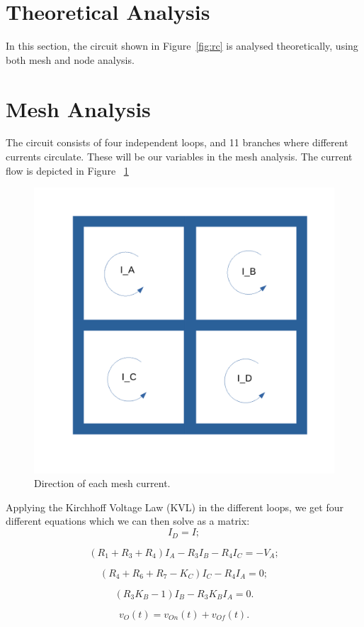 \section{Theoretical Analysis}
\label{sec:analysis}

In this section, the circuit shown in Figure~\ref{fig:rc} is analysed
theoretically, using both mesh and node analysis.

\section{Mesh Analysis}

The circuit consists of four independent loops, and 11 branches where different currents circulate. These will be our variables in the mesh analysis. The current flow is depicted in Figure ~\ref{fig:current}

\begin{figure}[h] \centering
\includegraphics[width=0.4\linewidth]{current.pdf}
\caption{Direction of each mesh current.}
\label{fig:current}
\end{figure}


Applying the Kirchhoff Voltage Law (KVL) in the different loops, we get four different equations which we can then solve as a matrix:
\begin{equation}
  I_D=I;
\end{equation}

\begin{equation}
  (R_1+R_3+R_4)I_A-R_3I_B-R_4I_C=-V_A;
\end{equation}

\begin{equation}
  (R_4+R_6+R_7-K_C)I_C-R_4I_A=0;
\end{equation}

\begin{equation}
  (R_3K_B-1)I_B-R_3K_BI_A=0.
\end{equation}


\begin{equation}
  v_O(t) = v_{On}(t) + v_{Of}(t).
  \label{eq:vo_sol}
\end{equation}

